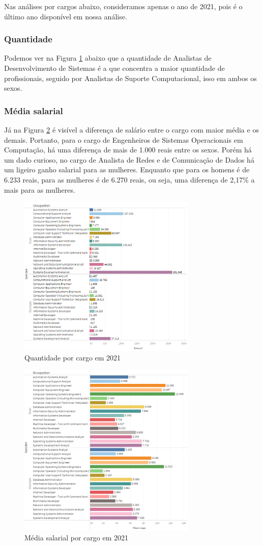 Nas análises por cargos abaixo, consideramos apenas o ano de 2021, pois é o último ano disponível em nossa análise.

\subsubsection{Quantidade}

Podemos ver na Figura \ref{fig_5_qnt_cbo} abaixo que a quantidade de Analistas de Desenvolvimento de Sistemas é a que concentra a maior quantidade de profissionais, seguido por Analistas de Suporte Computacional, isso em ambos os sexos. 

\subsubsection{Média salarial}

Já na Figura \ref{fig_5_sal_cbo} é visível a diferença de salário entre o cargo com maior média e os demais. Portanto, para o cargo de Engenheiros de Sistemas Operacionais em Computação, há uma diferença de mais de 1.000 reais entre os sexos. Porém há um dado curioso, no cargo de Analista de Redes e de Comunicação de Dados há um ligeiro ganho salarial para as mulheres. Enquanto que para os homens é de 6.233 reais, para as mulheres é de 6.270 reais, ou seja, uma diferença de 2,17\% a mais para as mulheres.

\begin{figure}[htbp]
	\centerline{
		\includegraphics[width=85mm]{assets/5_qnt_cbo.PNG}
	}
	\caption{Quantidade por cargo em 2021}
	\label{fig_5_qnt_cbo}
\end{figure}

\begin{figure}[htbp]
	\centerline{
		\includegraphics[width=85mm]{assets/5_sal_cbo.PNG}
	}
	\caption{Média salarial por cargo em 2021}
	\label{fig_5_sal_cbo}
\end{figure}